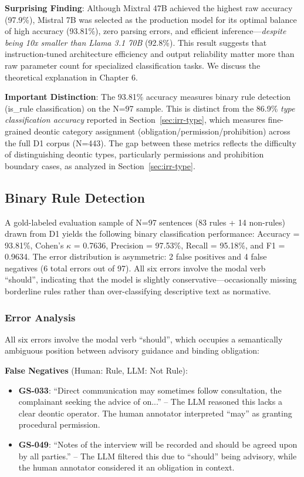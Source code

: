\textbf{Surprising Finding}: Although Mixtral 47B achieved the highest raw accuracy (97.9\%), Mistral 7B was selected as the production model for its optimal balance of high accuracy (93.81\%), zero parsing errors, and efficient inference---\textit{despite being 10x smaller than Llama 3.1 70B} (92.8\%). This result suggests that instruction-tuned architecture efficiency and output reliability matter more than raw parameter count for specialized classification tasks. We discuss the theoretical explanation in Chapter 6.

\textbf{Important Distinction}: The 93.81\% accuracy measures binary rule detection (is\_rule classification) on the N=97 sample. This is distinct from the 86.9\% \textit{type classification accuracy} reported in Section~\ref{sec:irr-type}, which measures fine-grained deontic category assignment (obligation/permission/prohibition) across the full D1 corpus (N=443). The gap between these metrics reflects the difficulty of distinguishing deontic types, particularly permissions and prohibition boundary cases, as analyzed in Section~\ref{sec:irr-type}.

\subsection{Binary Rule Detection}

A gold-labeled evaluation sample of N=97 sentences (83 rules + 14 non-rules) drawn from D1 yields the following binary classification performance: Accuracy = 93.81\%, Cohen's $\kappa$ = 0.7636, Precision = 97.53\%, Recall = 95.18\%, and F1 = 0.9634. The error distribution is asymmetric: 2 false positives and 4 false negatives (6 total errors out of 97). All six errors involve the modal verb ``should'', indicating that the model is slightly conservative---occasionally missing borderline rules rather than over-classifying descriptive text as normative.

\subsubsection{Error Analysis}
\label{sec:error-analysis-should}

All six errors involve the modal verb ``should'', which occupies a semantically ambiguous position between advisory guidance and binding obligation:

\textbf{False Negatives} (Human: Rule, LLM: Not Rule):
\begin{itemize}
    \item \textbf{GS-033}: ``Direct communication may sometimes follow consultation, the complainant seeking the advice of on...'' -- The LLM reasoned this lacks a clear deontic operator. The human annotator interpreted ``may'' as granting procedural permission.
    \item \textbf{GS-049}: ``Notes of the interview will be recorded and should be agreed upon by all parties.'' -- The LLM filtered this due to ``should'' being advisory, while the human annotator considered it an obligation in context.
\end{itemize}

